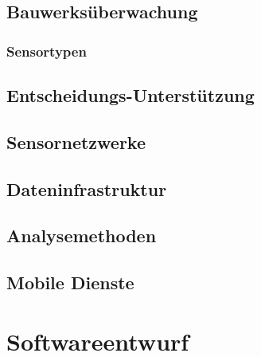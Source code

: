 \documentclass[a4paper,11pt]{report}
\begin{document}
\section{Bauwerksüberwachung}

\subsection{Sensortypen}

\section{Entscheidungs-Unterstützung}

\section{Sensornetzwerke}

\section{Dateninfrastruktur}

\section{Analysemethoden}

\section{Mobile Dienste}

\chapter{Softwareentwurf}


\pagebreak

{}
\end{document}
